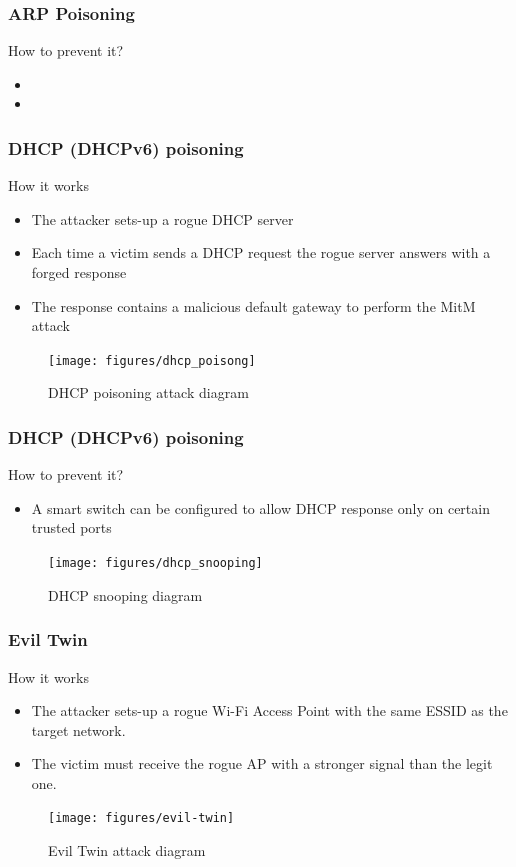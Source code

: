 \documentclass{beamer}
\begin{document}
\begin{frame}
  \frametitle{ARP Poisoning}
  \begin{block}{How to prevent it?}
  \pause
  \begin{itemize}
    \item
    \item
  \end{itemize}
\end{block}
\end{frame}
\begin{frame}
  \frametitle{DHCP (DHCPv6) poisoning}
  \begin{block}{How it works}
  \begin{itemize}
    \item The attacker sets-up a rogue DHCP server
    \item Each time a victim sends a DHCP request the rogue server answers with a forged response
    \item The response contains a malicious default gateway to perform the MitM attack
  \end{itemize}
\end{block}
  \begin{figure}
  \texttt{[image: figures/dhcp\_poisong]}
  \caption*{DHCP poisoning attack diagram}
  \end{figure}
\end{frame}


\begin{frame}
  \frametitle{DHCP (DHCPv6) poisoning}
  \begin{block}{How to prevent it?}
  \pause
  \begin{itemize}
    \item A smart switch can be configured to allow DHCP response only on certain trusted ports
  \end{itemize}
\end{block}
  \begin{figure}
  \texttt{[image: figures/dhcp\_snooping]}
  \caption*{DHCP snooping diagram}
  \end{figure}
\end{frame}


\begin{frame}
  \frametitle{Evil Twin}
  \begin{block}{How it works}
  \begin{itemize}
    \item The attacker sets-up a rogue Wi-Fi Access Point with the same ESSID as the target network.
    \item The victim must receive the rogue AP with a stronger signal than the legit one.
  \end{itemize}
\end{block}
  \begin{figure}
    \texttt{[image: figures/evil-twin]}
    \caption*{Evil Twin attack diagram}
  \end{figure}
\end{frame}
\end{document}
